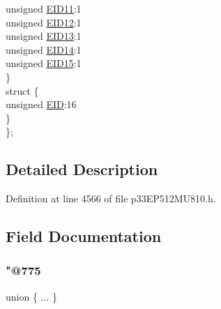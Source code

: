 \begin{DoxyCompactItemize}
\begin{tabbing}
\>\>unsigned \hyperlink{structtag_c1_r_x_f14_e_i_d_b_i_t_s_a710bdb0d602deb021b0be99066008018}{EID11}:1\\
\>\>unsigned \hyperlink{structtag_c1_r_x_f14_e_i_d_b_i_t_s_aa347bb85867bd8d4e0124f7cff8c6472}{EID12}:1\\
\>\>unsigned \hyperlink{structtag_c1_r_x_f14_e_i_d_b_i_t_s_a37d5f3edcbf6ef62f848fd4f3c584f79}{EID13}:1\\
\>\>unsigned \hyperlink{structtag_c1_r_x_f14_e_i_d_b_i_t_s_a7ffc0b0e0d99b8476b6f9a45337c17ab}{EID14}:1\\
\>\>unsigned \hyperlink{structtag_c1_r_x_f14_e_i_d_b_i_t_s_a293cd7dc1746257fa75a60cbd9383cd7}{EID15}:1\\
\>\} \\
\>struct \{\\
\>\>unsigned \hyperlink{structtag_c1_r_x_f14_e_i_d_b_i_t_s_ae80b378c9141f7c03e0b4e55b5f4b54d}{EID}:16\\
\>\} \\
\}; \\

\end{tabbing}\end{DoxyCompactItemize}


\subsection{Detailed Description}


Definition at line 4566 of file p33\+E\+P512\+M\+U810.\+h.



\subsection{Field Documentation}
\mbox{\label{structtag_c1_r_x_f14_e_i_d_b_i_t_s_ab1f7e87ef72021373acf8f2da3e8628e}} 
\subsubsection{\texorpdfstring{"@775}{@775}}
{\footnotesize\ttfamily union \{ ... \} }

\mbox{\label{structtag_c1_r_x_f14_e_i_d_b_i_t_s_ae80b378c9141f7c03e0b4e55b5f4b54d}} 

